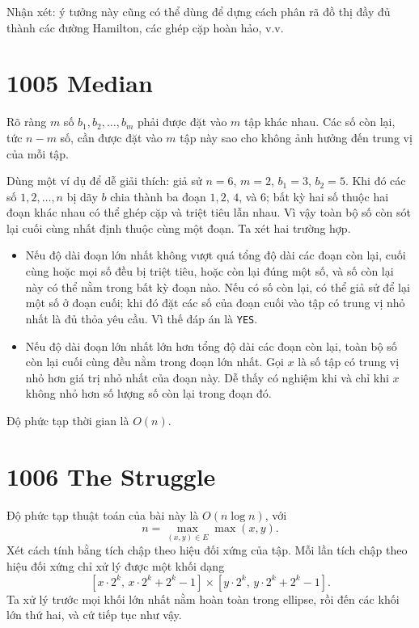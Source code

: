 \documentclass[11pt]{article}
\begin{document}
Nhận xét: ý tưởng này cũng có thể dùng để dựng cách phân rã đồ thị đầy đủ
thành các đường Hamilton, các ghép cặp hoàn hảo, v.v.

\section{1005 Median}

Rõ ràng $m$ số $b_1,b_2,\ldots,b_m$ phải được đặt vào $m$ tập khác nhau. Các
số còn lại, tức $n-m$ số, cần được đặt vào $m$ tập này sao cho không ảnh
hưởng đến trung vị của mỗi tập.

Dùng một ví dụ để dễ giải thích: giả sử $n=6$, $m=2$, $b_1=3$, $b_2=5$. Khi
đó các số $1,2,\ldots,n$ bị dãy $b$ chia thành ba đoạn $1,2$, $4$, và $6$;
bất kỳ hai số thuộc hai đoạn khác nhau có thể ghép cặp và triệt tiêu lẫn
nhau. Vì vậy toàn bộ số còn sót lại cuối cùng nhất định thuộc cùng một đoạn.
Ta xét hai trường hợp.

\begin{itemize}
  \item Nếu độ dài đoạn lớn nhất không vượt quá tổng độ dài các đoạn còn
  lại, cuối cùng hoặc mọi số đều bị triệt tiêu, hoặc còn lại đúng một số, và
  số còn lại này có thể nằm trong bất kỳ đoạn nào. Nếu có số còn lại, có thể
  giả sử để lại một số ở đoạn cuối; khi đó đặt các số của đoạn cuối vào tập
  có trung vị nhỏ nhất là đủ thỏa yêu cầu. Vì thế đáp án là
  \texttt{YES}.
  \item Nếu độ dài đoạn lớn nhất lớn hơn tổng độ dài các đoạn còn lại, toàn
  bộ số còn lại cuối cùng đều nằm trong đoạn lớn nhất. Gọi $x$ là số tập có
  trung vị nhỏ hơn giá trị nhỏ nhất của đoạn này. Dễ thấy có nghiệm khi và
  chỉ khi $x$ không nhỏ hơn số lượng số còn lại trong đoạn đó.
\end{itemize}

Độ phức tạp thời gian là $O(n)$.

\section{1006 The Struggle}

Độ phức tạp thuật toán của bài này là $O(n\log n)$, với
\[
  n=\max_{(x,y)\in E}\max(x,y).
\]
Xét cách tính bằng tích chập theo hiệu đối xứng của tập. Mỗi lần tích chập
theo hiệu đối xứng chỉ xử lý được một khối dạng
\[
  [x\cdot 2^k,\,x\cdot 2^k+2^k-1]
  \times
  [y\cdot 2^k,\,y\cdot 2^k+2^k-1].
\]
Ta xử lý trước mọi khối lớn nhất nằm hoàn toàn trong ellipse, rồi đến các
khối lớn thứ hai, và cứ tiếp tục như vậy.
\end{document}
